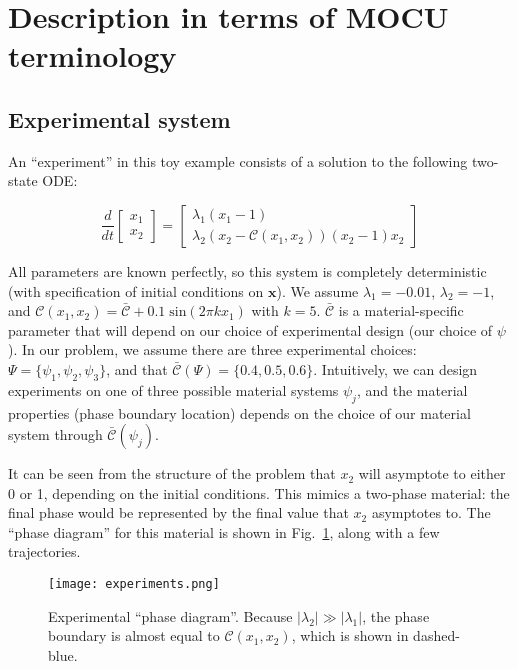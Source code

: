 \documentclass[11pt]{article}
\begin{document}
\section{Description in terms of MOCU terminology}

\subsection{Experimental system}

An ``experiment'' in this toy example consists of a solution to the following two-state ODE:

\begin{equation}
\frac{d}{dt}
\begin{bmatrix}
x_1 \\
x_2
\end{bmatrix}
=
\begin{bmatrix}
\lambda_1 (x_1 - 1) \\
\lambda_2 \left(x_2 - \mathcal{C}(x_1,x_2)\right)(x_2-1)x_2
\end{bmatrix}
\label{eq:fullphysics}
\end{equation}

All parameters are known perfectly, so this system is completely
deterministic (with specification of initial conditions on
$\bm{x}$). We assume $\lambda_1=-0.01$, $\lambda_2 = -1$, and
$\mathcal{C}(x_1,x_2) = \mathcal{\bar{C}} + 0.1 \; \text{sin}(2 \pi k
x_1)$ with $k=5$. $\mathcal{\bar{C}}$ is a material-specific parameter
that will depend on our choice of experimental design (our choice of
$\psi$). In our problem, we assume there are three experimental
choices: $\Psi = \lbrace \psi_1 , \psi_2 , \psi_3 \rbrace$, and that
$\mathcal{\bar{C}}(\Psi) = \lbrace 0.4 , 0.5 ,
0.6 \rbrace$. Intuitively, we can design experiments on one of three
possible material systems $\psi_j$, and the material properties (phase
boundary location) depends on the choice of our material system
through $\mathcal{\bar{C}}(\psi_j)$.

It can be seen from the structure of the problem that $x_2$ will
asymptote to either 0 or 1, depending on the initial conditions. This
mimics a two-phase material: the final phase would be represented by
the final value that $x_2$ asymptotes to. The ``phase diagram'' for
this material is shown in Fig.~\ref{fig:experiments}, along with a few
trajectories.

\begin{figure}[htb]
  \centering
  \texttt{[image: experiments.png]}
  \caption{Experimental ``phase diagram''. Because $|\lambda_2| \gg |\lambda_1|$, the phase boundary is almost equal to $\mathcal{C}(x_1,x_2)$, which is shown in dashed-blue.}
  \label{fig:experiments}
\end{figure}
\end{document}
